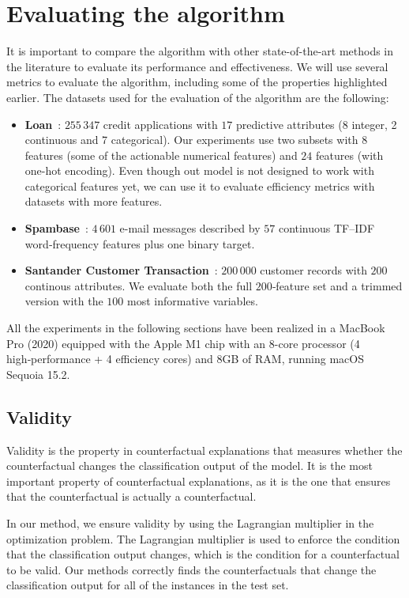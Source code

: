 \documentclass[12pt]{extarticle}
\numberwithin{equation}{section}
\begin{document}
\section{Evaluating the algorithm}\label{sec:evaluation}
It is important to compare the algorithm with other state-of-the-art methods in the literature to evaluate its performance and effectiveness. We will use several metrics to evaluate the algorithm, including some of the properties highlighted earlier. The datasets used for the evaluation of the algorithm are the following:
\begin{itemize}
  \item \textbf{Loan}~\cite{kaggleLoan1}: $255\,347$ credit
        applications with $17$ predictive attributes (8 integer, 2 continuous and 7 categorical).  Our experiments use two subsets with $8$ features (some of the actionable numerical features) and $24$ features (with one-hot encoding). Even though out model is not designed to work with categorical features yet, we can use it to evaluate efficiency metrics with datasets with more features.
  \item \textbf{Spambase}~\cite{spambase}: $4\,601$ e-mail messages described by $57$ continuous TF–IDF word‐frequency features plus one binary target. 
  \item \textbf{Santander Customer Transaction}~\cite{santander}:
        $200\,000$ customer records with $200$ continous attributes.
        We evaluate both the full $200$‐feature set and a trimmed version with
        the $100$ most informative variables.
\end{itemize}

All the experiments in the following sections have been realized in a MacBook Pro (2020) equipped with the Apple M1 chip with an 8-core processor (4 high‑performance + 4 efficiency cores) and 8GB of RAM, running macOS Sequoia 15.2.

\subsection{Validity}\label{sec:validity}
Validity is the property in counterfactual explanations that measures whether the counterfactual changes the classification output of the model. It is the most important property of counterfactual explanations, as it is the one that ensures that the counterfactual is actually a counterfactual. 

In our method, we ensure validity by using the Lagrangian multiplier in the optimization problem. The Lagrangian multiplier is used to enforce the condition that the classification output changes, which is the condition for a counterfactual to be valid. Our methods correctly finds the counterfactuals that change the classification output for all of the instances in the test set.
\end{document}
